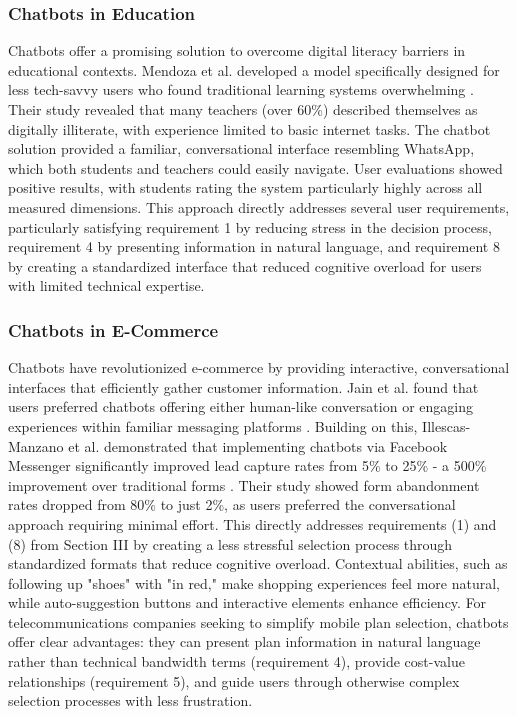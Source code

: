 \documentclass[conference]{IEEEtran}
\begin{document}
\subsubsection{Chatbots in Education}
Chatbots offer a promising solution to overcome digital literacy barriers in educational contexts. Mendoza et al. developed a model specifically designed for less tech-savvy users who found traditional learning systems overwhelming \cite{b7}. Their study revealed that many teachers (over 60\%) described themselves as digitally illiterate, with experience limited to basic internet tasks. The chatbot solution provided a familiar, conversational interface resembling WhatsApp, which both students and teachers could easily navigate. User evaluations showed positive results, with students rating the system particularly highly across all measured dimensions. This approach directly addresses several user requirements, particularly satisfying requirement 1 by reducing stress in the decision process, requirement 4 by presenting information in natural language, and requirement 8 by creating a standardized interface that reduced cognitive overload for users with limited technical expertise.
\subsubsection{Chatbots in E-Commerce}
Chatbots have revolutionized e-commerce by providing interactive, conversational interfaces that efficiently gather customer information. Jain et al. found that users preferred chatbots offering either human-like conversation or engaging experiences within familiar messaging platforms \cite{b8}. Building on this, Illescas-Manzano et al. demonstrated that implementing chatbots via Facebook Messenger significantly improved lead capture rates from 5\% to 25\% - a 500\% improvement over traditional forms \cite{b9}. Their study showed form abandonment rates dropped from 80\% to just 2\%, as users preferred the conversational approach requiring minimal effort. This directly addresses requirements (1) and (8) from Section III by creating a less stressful selection process through standardized formats that reduce cognitive overload. Contextual abilities, such as following up "shoes" with "in red," make shopping experiences feel more natural, while auto-suggestion buttons and interactive elements enhance efficiency. For telecommunications companies seeking to simplify mobile plan selection, chatbots offer clear advantages: they can present plan information in natural language rather than technical bandwidth terms (requirement 4), provide cost-value relationships (requirement 5), and guide users through otherwise complex selection processes with less frustration.
\end{document}
